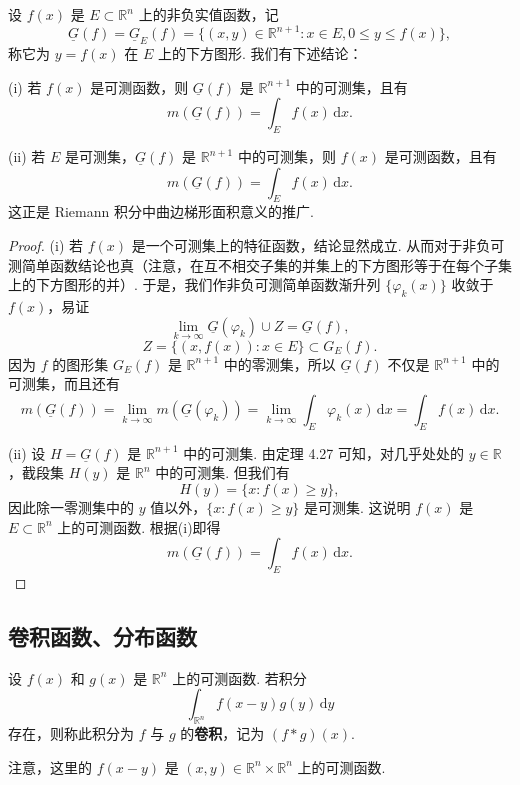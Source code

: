 \documentclass[../../main.tex]{subfiles}%
\begin{document}
\begin{theorem}[积分的几何意义]\label{theorem:积分的几何意义}
设 \( f(x) \) 是 \( E \subset \mathbb{R}^n \) 上的非负实值函数，记
\[
\underline{G}(f) = \underline{G}_E(f) = \{ (x, y) \in \mathbb{R}^{n + 1} : x \in E, 0 \leqslant y \leqslant f(x) \},
\]
称它为 \( y = f(x) \) 在 \( E \) 上的下方图形. 我们有下述结论：

(i) 若 \( f(x) \) 是可测函数，则 \( \underline{G}(f) \) 是 \( \mathbb{R}^{n + 1} \) 中的可测集，且有
\[
m(\underline{G}(f)) = \int_E f(x) \, \mathrm{d}x.
\]

(ii) 若 \( E \) 是可测集，\( \underline{G}(f) \) 是 \( \mathbb{R}^{n + 1} \) 中的可测集，则 \( f(x) \) 是可测函数，且有
\[
m(\underline{G}(f)) = \int_E f(x) \, \mathrm{d}x.
\]
这正是 Riemann 积分中曲边梯形面积意义的推广.
\end{theorem}
\begin{proof}
(i) 若 \( f(x) \) 是一个可测集上的特征函数，结论显然成立. 从而对于非负可测简单函数结论也真（注意，在互不相交子集的并集上的下方图形等于在每个子集上的下方图形的并）. 于是，我们作非负可测简单函数渐升列 \( \{ \varphi_k(x) \} \) 收敛于 \( f(x) \)，易证
\[
\lim_{k \to \infty} \underline{G}(\varphi_k) \cup Z = \underline{G}(f),
\]
\[
Z = \{ (x, f(x)) : x \in E \} \subset G_E(f).
\]
因为 \( f \) 的图形集 \( G_E(f) \) 是 \( \mathbb{R}^{n + 1} \) 中的零测集，所以 \( \underline{G}(f) \) 不仅是 \( \mathbb{R}^{n + 1} \) 中的可测集，而且还有
\[
m(\underline{G}(f)) = \lim_{k \to \infty} m(\underline{G}(\varphi_k)) = \lim_{k \to \infty} \int_E \varphi_k(x) \, \mathrm{d}x = \int_E f(x) \, \mathrm{d}x.
\]

(ii) 设 \( H = \underline{G}(f) \) 是 \( \mathbb{R}^{n + 1} \) 中的可测集. 由定理 4.27 可知，对几乎处处的 \( y \in \mathbb{R} \)，截段集 \( H(y) \) 是 \( \mathbb{R}^n \) 中的可测集. 但我们有
\[
H(y) = \{ x : f(x) \geqslant y \},
\]
因此除一零测集中的 \( y \) 值以外，\( \{ x : f(x) \geqslant y \} \) 是可测集. 这说明 \( f(x) \) 是 \( E \subset \mathbb{R}^n \) 上的可测函数. 根据(i)即得
\[
m(\underline{G}(f)) = \int_E f(x) \, \mathrm{d}x.
\]
\end{proof}



\subsection{卷积函数、分布函数}

\begin{definition}[卷积]
设 \( f(x) \) 和 \( g(x) \) 是 \( \mathbb{R}^n \) 上的可测函数. 若积分
\[
\int_{\mathbb{R}^n} f(x - y) g(y) \, \mathrm{d}y
\]
存在，则称此积分为 \( f \) 与 \( g \) 的\textbf{卷积}，记为 \( (f * g)(x) \).
\end{definition}
\begin{remark}
注意，这里的 \( f(x - y) \) 是 \( (x, y) \in \mathbb{R}^n \times \mathbb{R}^n \) 上的可测函数.
\end{remark}
\end{document}
